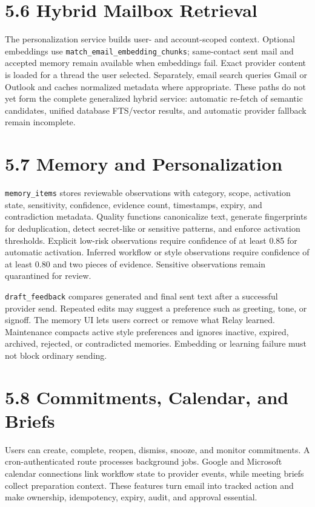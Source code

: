 \documentclass[
]{report}
\begin{document}
\section{5.6 Hybrid Mailbox
Retrieval}\label{56-hybrid-mailbox-retrieval}

The personalization service builds user- and account-scoped context.
Optional embeddings use \texttt{match\_email\_embedding\_chunks};
same-contact sent mail and accepted memory remain available when
embeddings fail. Exact provider content is loaded for a thread the user
selected. Separately, email search queries Gmail or Outlook and caches
normalized metadata where appropriate. These paths do not yet form the
complete generalized hybrid service: automatic re-fetch of semantic
candidates, unified database FTS/vector results, and automatic provider
fallback remain incomplete.

\section{5.7 Memory and
Personalization}\label{57-memory-and-personalization}

\texttt{memory\_items} stores reviewable observations with category,
scope, activation state, sensitivity, confidence, evidence count,
timestamps, expiry, and contradiction metadata. Quality functions
canonicalize text, generate fingerprints for deduplication, detect
secret-like or sensitive patterns, and enforce activation thresholds.
Explicit low-risk observations require confidence of at least 0.85 for
automatic activation. Inferred workflow or style observations require
confidence of at least 0.80 and two pieces of evidence. Sensitive
observations remain quarantined for review.

\texttt{draft\_feedback} compares generated and final sent text after a
successful provider send. Repeated edits may suggest a preference such
as greeting, tone, or signoff. The memory UI lets users correct or
remove what Relay learned. Maintenance compacts active style preferences
and ignores inactive, expired, archived, rejected, or contradicted
memories. Embedding or learning failure must not block ordinary sending.

\section{5.8 Commitments, Calendar, and
Briefs}\label{58-commitments-calendar-and-briefs}

Users can create, complete, reopen, dismiss, snooze, and monitor
commitments. A cron-authenticated route processes background jobs.
Google and Microsoft calendar connections link workflow state to
provider events, while meeting briefs collect preparation context. These
features turn email into tracked action and make ownership, idempotency,
expiry, audit, and approval essential.
\end{document}
